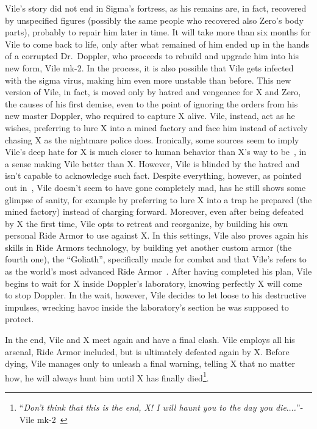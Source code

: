 Vile's story did not end in Sigma's fortress, as his remains are, in fact, recovered by unspecified figures (possibly the same people who recovered also Zero's body parts), probably to repair him later in time. It will take more than six months for Vile to come back to life, only after what remained of him ended up in the hands of a corrupted Dr.~Doppler, who proceeds to rebuild and upgrade him into his new form, Vile mk-2. In the process, it is also possible that Vile gets infected with the sigma virus, making him even more unstable than before. This new version of Vile, in fact, is moved only by hatred and vengeance for X and Zero, the causes of his first demise, even to the point of ignoring the orders from his new master Doppler, who required to capture X alive. Vile, instead, act as he wishes, preferring to lure X into a mined factory and face him instead of actively chasing X as the nightmare police does. Ironically, some sources seem to imply Vile's deep hate for X is much closer to human behavior than X's way to be~\cite{Xcoll1:Manual_X3,wayback:X3_resources}, in a sense making Vile better than X. However, Vile is blinded by the hatred and isn't capable to acknowledge such fact. Despite everything, however, as pointed out in~\cite{wayback:X3_resources}, Vile  doesn't seem to have gone completely mad, has he still shows some glimpse of sanity, for example by preferring to lure X into a trap he prepared (the mined factory) instead of charging forward. Moreover, even after being defeated by X the first time, Vile opts to retreat and reorganize, by building his own personal Ride Armor to use against X. In this settings, Vile also proves again his skills in Ride Armors technology, by building yet another custom armor (the fourth one), the ``Goliath'', specifically made for combat and that Vile's refers to as the world's most advanced Ride Armor~\cite{book:MH_field_guide}.  After having completed his plan, Vile begins to wait for X inside Doppler's laboratory, knowing perfectly X will come to stop Doppler. In the wait, however, Vile decides to let loose to his destructive impulses, wrecking havoc inside the laboratory's section he was supposed to protect. 

In the end, Vile and X meet again and have a final clash. Vile employs all his arsenal, Ride Armor included, but is ultimately defeated again by X. Before dying, Vile manages only to unleash a final warning, telling X that no matter how, he will always hunt him until X has finally died\footnote{``\textit{Don’t think that this is the end, X! I will haunt you to the day you die$\dots$.}''-Vile mk-2~\cite{wordpress:X3_japanese_script}}.
